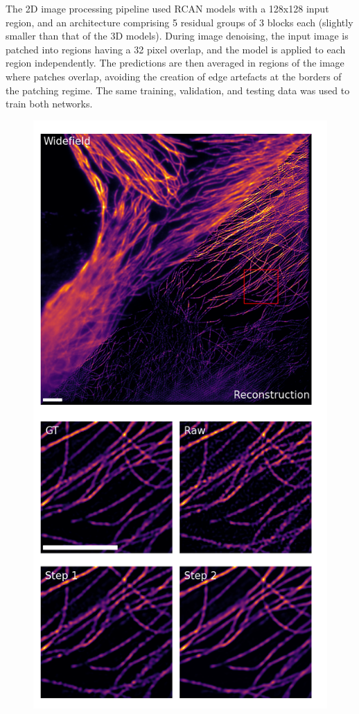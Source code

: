 \documentclass[12pt]{article}
\begin{document}
The 2D image processing pipeline used RCAN models with a 128x128 input region,
and an architecture comprising 5 residual groups of 3 blocks each (slightly smaller than that of the 3D models).
During image denoising, the input image is patched into regions having a 32 pixel overlap,
and the model is applied to each region independently.
The predictions are then averaged in regions of the image where patches overlap,
avoiding the creation of edge artefacts at the borders of the patching regime.
The same training, validation, and testing data was used to train both networks.

\begin{figure}[hbtp]
    \includegraphics[scale=0.8, center]{figures/microtub_samples.png}

\end{figure}
\end{document}
